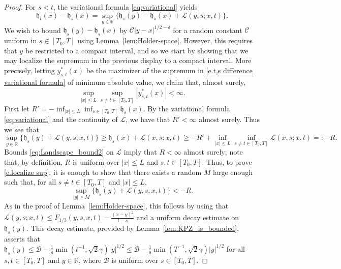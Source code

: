 \documentclass[oneside,final,11pt]{amsart}
\theoremstyle{definition}
\newcommand{\fh}{\mathfrak{h}}
\newcommand{\R}{\mathbb{R}}
\newcommand{\CB}{\mathcal{B}}
\newcommand{\CL}{\mathcal{L}}
\newcommand{\1}[1]{\mathbf{1}_{#1}}
\newcommand{\mc}{\mathcal}
\numberwithin{equation}{section}
\begin{document}
\begin{proof}
For $s < t$,  the variational formula \eqref{eq:variational} yields
%
\begin{equation}\label{e.t,s difference variational formula}
	\fh_t(x) - \fh_s(x) = \sup_{y \in \R} \bigl\{ \fh_s(y) - \fh_s(x) + \CL(y, s; x, t) \bigr\}.
\end{equation}
%
We wish to bound $\fh_s(y) -\fh_s(x)$ by $\mc C|y-x|^{1/2-\delta}$ for a random constant $\mc C$ uniform in $s\in[T_0,T]$ using Lemma~\ref{lem:Holder-space}. However, this requires that $y$ be restricted to a compact interval, and so we start by showing that we may localize the supremum in the previous display to a compact interval. More precisely, letting $y_{s,t}^*(x)$ be the maximizer of the supremum in \eqref{e.t,s difference variational formula} of minimum absolute value, we claim that, almost surely,
%
\begin{equation}\label{e.localize sup}
\sup_{|x|\leq L}\sup_{s\neq t\in[T_0, T]} |y_{s,t}^*(x)| < \infty.
\end{equation}
%
First let $R' = -\inf_{|x|\leq L}\inf_{s\in[T_0,T]} \fh_s(x)$. By the variational formula \eqref{eq:variational} and the continuity of $\CL$, we have that $R'<\infty$ almost surely. Thus we see that
%
$$\sup_{y \in \R} \bigl\{ \fh_s(y) + \CL(y, s; x, t) \bigr\} \geq \fh_s(x) + \CL(x,s; x,t) \geq -R' + \inf_{|x|\leq L}\inf_{s\neq t\in[T_0,T]} \CL(x,s; x,t) =: -R.$$
%
Bounds  \eqref{eq:Landscape_bound2} on $\CL$ imply that $R<\infty$ almost surely; note that, by definition, $R$ is uniform over $|x|\leq L$ and $s,t\in[T_0,T]$. Thus, to prove \eqref{e.localize sup}, it is enough to show that there exists a random $M$ large enough such that, for all $s\neq t\in[T_0,T]$ and $|x|\leq L$,
%
\begin{equation}\label{e.defM}
\sup_{|y|\geq M} \bigl\{\fh_s(y) + \CL(y,s; x,t) \bigr\} < -R.
\end{equation}
%
As in the proof of Lemma~\ref{lem:Holder-space}, this follows by using that $\CL(y,s; x,t) \leq F_{1/3}(y,s,x,t) - \frac{(x-y)^2}{t-s}$ and a uniform decay estimate on $\fh_s(y)$. This decay estimate, provided by Lemma~\ref{lem:KPZ_is_bounded}, asserts that $\fh_s(y) \leq \CB - \frac{1}{8}\min(t^{-1}, \sqrt{2}\gamma) |y|^{1/2} \leq \CB - \frac{1}{8}\min(T^{-1}, \sqrt{2}\gamma) |y|^{1/2}$ for all $s,t\in[T_0, T]$ and $y\in \R$, where $\CB$ is uniform over $s\in[T_0,T]$.


\end{proof}
\end{document}
